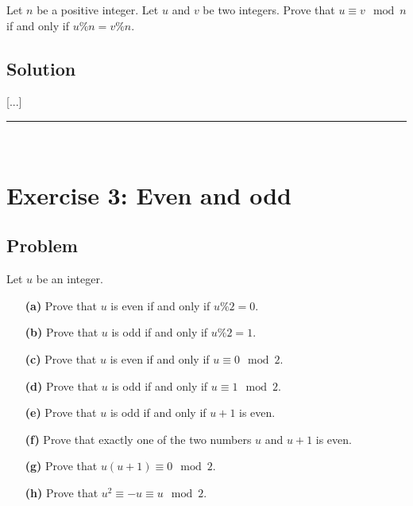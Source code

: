 \documentclass[paper=a4, fontsize=12pt]{scrartcl} %
\newcommand{\tup}[1]{\left( #1 \right)}
\newcommand{\horrule}[1]{\rule{\linewidth}{#1}} %
\theoremstyle{plainsl}
\theoremstyle{definition}
\theoremstyle{remark}
\begin{document}
Let $n$ be a positive integer.
Let $u$ and $v$ be two integers.
Prove that $u \equiv v \mod n$
if and only if $u \% n = v \% n$.

\subsection{Solution}

[...]

\horrule{0.3pt} \\[0.4cm]

\section{Exercise 3: Even and odd}

\subsection{Problem}

Let $u$ be an integer.

\begin{enumerate}

\item[\textbf{(a)}]
Prove that $u$ is even if and only if $u \% 2 = 0$.

\item[\textbf{(b)}]
Prove that $u$ is odd if and only if $u \% 2 = 1$.

\item[\textbf{(c)}]
Prove that $u$ is even if and only if $u \equiv 0 \mod 2$.

\item[\textbf{(d)}]
Prove that $u$ is odd if and only if $u \equiv 1 \mod 2$.

\item[\textbf{(e)}]
Prove that $u$ is odd if and only if $u + 1$ is even.

\item[\textbf{(f)}]
Prove that exactly one of the two numbers $u$ and $u + 1$ is even.

\item[\textbf{(g)}]
Prove that $u \tup{u+1} \equiv 0 \mod 2$.

\item[\textbf{(h)}]
Prove that $u^2 \equiv -u \equiv u \mod 2$.

\end{enumerate}
\end{document}
